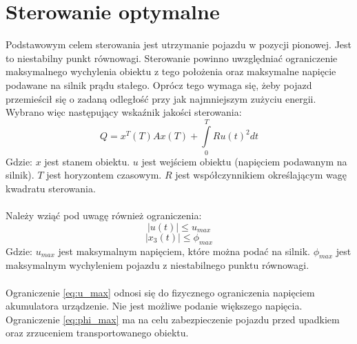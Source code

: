 \section{Sterowanie optymalne}
\label{sec:sterowanie_optymalne}

Podstawowym celem sterowania jest utrzymanie pojazdu w pozycji pionowej. Jest to niestabilny punkt równowagi. Sterowanie powinno uwzględniać ograniczenie maksymalnego wychylenia obiektu z tego położenia oraz maksymalne napięcie podawane na silnik prądu stałego. Oprócz tego wymaga się, żeby pojazd przemieścił się o zadaną odległość przy jak najmniejszym zużyciu energii. Wybrano więc następujący wskaźnik jakości sterowania:
\begin{equation}
Q=x^T(T)Ax(T)+\int\limits_{0}^{T}Ru(t)^2dt
\end{equation}
\noindent Gdzie:\newline
\(x\) jest stanem obiektu.\newline
\(u\) jest wejściem obiektu (napięciem podawanym na silnik).\newline
\(T\) jest horyzontem czasowym.\newline
\(R\) jest współczynnikiem określającym wagę kwadratu sterowania.

\paragraph*{}
Należy wziąć pod uwagę również ograniczenia:
\begin{equation}
|u(t)|\leqslant u_{max}
\label{eq:u_max}
\end{equation}
\begin{equation}
|x_3(t)|\leqslant \phi_{max}
\label{eq:phi_max}
\end{equation}
\noindent Gdzie:\newline
\(u_{max}\) jest maksymalnym napięciem, które można podać na silnik.\newline
\(\phi_{max}\) jest maksymalnym wychyleniem pojazdu z niestabilnego punktu równowagi.

\paragraph*{}
Ograniczenie \eqref{eq:u_max} odnosi się do fizycznego ograniczenia napięciem akumulatora urządzenie. Nie jest możliwe podanie większego napięcia. Ograniczenie \eqref{eq:phi_max} ma na celu zabezpieczenie pojazdu przed upadkiem oraz zrzuceniem transportowanego obiektu.